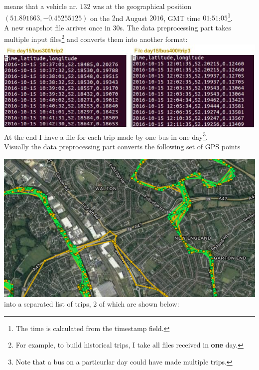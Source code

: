 \documentclass[12pt,a4paper,oneside,openright]{report}
\begin{document}
means that a vehicle nr. $132$ was at the geographical position
$(51.891663, -0.45255125)$ on the $2$nd August $2016$, GMT time
$01$:$51$:$05$\footnote{The time is calculated from the timestamp field.}. \\

A new snapshot file arrives once in $30$s. The data preprocessing part
takes multiple input files\footnote{For example, to build historical trips, I take all
files received in \textbf{one} day.} and converts them into another format: \\

\includegraphics[width=\textwidth]{figs/converted_format.jpg} \\

At the end I have a file for each trip made by one bus in one
day\footnote{Note that a bus on a particurlar day could have made
multiple trips.}. \\

Visually the data preprocessing part converts the following set of GPS points

\includegraphics[width=\textwidth]{figs/unprocessed.png} \\

into a separated list of trips, 2 of which are shown below:
\end{document}
